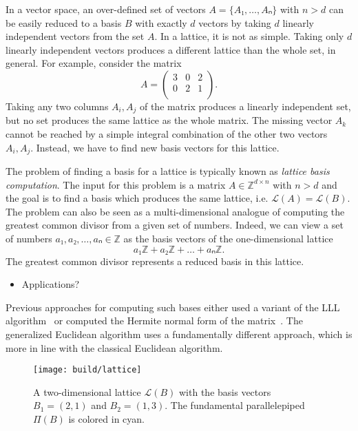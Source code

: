 In a vector space, an over-defined set of vectors $A = \{A₁, …, Aₙ\}$ with $n > d$
can be easily reduced to a basis $B$ with exactly $d$ vectors by taking $d$
linearly independent vectors from the set $A$.
In a lattice, it is not as simple.
Taking only $d$ linearly independent vectors produces a different lattice than
the whole set, in general.
For example, consider the matrix
\[
  A = \begin{pmatrix}
    3 & 0 & 2 \\
    0 & 2 & 1 \\
  \end{pmatrix}.
\]
Taking any two columns $A_i, A_j$ of the matrix produces a linearly independent
set, but no set produces the same lattice as the whole matrix.
The missing vector $A_k$ cannot be reached by a simple integral combination of the
other two vectors $A_i, A_j$.
Instead, we have to find new basis vectors for this lattice.

The problem of finding a basis for a lattice is typically known as \emph{lattice basis computation}.
The input for this problem is a matrix $A ∈ ℤ^{d×n}$ with $n > d$ and the goal
is to find a basis which produces the same lattice, i.e. $\mathcal L(A) = \mathcal L(B)$.
The problem can also be seen as a multi-dimensional analogue of
computing the greatest common divisor from a given set of numbers.
Indeed, we can view a set of numbers $a₁, a₂, …, aₙ ∈ ℤ$ as the basis vectors
of the one-dimensional lattice
\[
  a₁ℤ + a₂ ℤ + \dots + aₙ ℤ.
\]
The greatest common divisor represents a reduced basis in this lattice.

\begin{itemize}
  \item Applications? \cite{Ajtai96,Gentry08}
\end{itemize}

Previous approaches for computing such bases either used a variant of the LLL
algorithm~\cite{Lenstra82} or computed the Hermite normal form of the
matrix~\cite{Storjohann96}.
The generalized Euclidean algorithm uses a fundamentally different approach,
which is more in line with the classical Euclidean algorithm.

\begin{figure}[tbp]
  \centering
  \texttt{[image: build/lattice]}
  \caption{
    A two-dimensional lattice $\mathcal L(B)$ with the basis vectors $B_1 = (2,
    1)$ and $B_2 = (1, 3)$. The fundamental parallelepiped $Π(B)$ is colored in
    {\color{cyan}cyan}.
  }
\end{figure}

